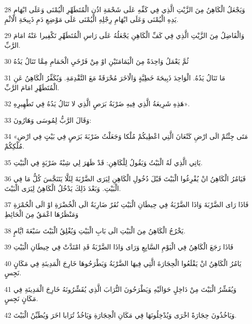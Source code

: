 \par 28 وَيَجْعَلُ الْكَاهِنُ مِنَ الزَّيْتِ الَّذِي فِي كَفِّهِ عَلَى شَحْمَةِ اذُنِ الْمُتَطَهِّرِ الْيُمْنَى وَعَلَى ابْهَامِ يَدِهِ الْيُمْنَى وَعَلَى ابْهَامِ رِجْلِهِ الْيُمْنَى عَلَى مَوْضِعِ دَمِ ذَبِيحَةِ الْاثْمِ.
\par 29 وَالْفَاضِلُ مِنَ الزَّيْتِ الَّذِي فِي كَفِّ الْكَاهِنِ يَجْعَلُهُ عَلَى رَاسِ الْمُتَطَهِّرِ تَكْفِيرا عَنْهُ امَامَ الرَّبِّ.
\par 30 ثُمَّ يَعْمَلُ وَاحِدَةً مِنَ الْيَمَامَتَيْنِ اوْ مِنْ فَرْخَيِ الْحَمَامِ مِمَّا تَنَالُ يَدُهُ
\par 31 مَا تَنَالُ يَدُهُ. الْوَاحِدَ ذَبِيحَةَ خَطِيَّةٍ وَالْاخَرَ مُحْرَقَةً مَعَ التَّقْدِمَةِ. وَيُكَفِّرُ الْكَاهِنُ عَنِ الْمُتَطَهِّرِ امَامَ الرَّبِّ.
\par 32 هَذِهِ شَرِيعَةُ الَّذِي فِيهِ ضَرْبَةُ بَرَصٍ الَّذِي لا تَنَالُ يَدُهُ فِي تَطْهِيرِهِ».
\par 33 وَقَالَ الرَّبُّ لِمُوسَى وَهَارُونَ:
\par 34 «مَتَى جِئْتُمْ الَى ارْضِ كَنْعَانَ الَّتِي اعْطِيكُمْ مُلْكا وَجَعَلْتُ ضَرْبَةَ بَرَصٍ فِي بَيْتٍ فِي ارْضِ مُلْكِكُمْ.
\par 35 يَاتِي الَّذِي لَهُ الْبَيْتُ وَيَقُولُ لِلْكَاهِنِ: قَدْ ظَهَرَ لِي شِبْهُ ضَرْبَةٍ فِي الْبَيْتِ.
\par 36 فَيَامُرُ الْكَاهِنُ انْ يُفْرِغُوا الْبَيْتَ قَبْلَ دُخُولِ الْكَاهِنِ لِيَرَى الضَّرْبَةَ لِئَلَّا يَتَنَجَّسَ كُلُّ مَا فِي الْبَيْتِ. وَبَعْدَ ذَلِكَ يَدْخُلُ الْكَاهِنُ لِيَرَى الْبَيْتَ.
\par 37 فَاذَا رَاى الضَّرْبَةَ وَاذَا الضَّرْبَةُ فِي حِيطَانِ الْبَيْتِ نُقَرٌ ضَارِبَةٌ الَى الْخُضْرَةِ اوْ الَى الْحُمْرَةِ وَمَنْظَرُهَا اعْمَقُ مِنَ الْحَائِطِ
\par 38 يَخْرُجُ الْكَاهِنُ مِنَ الْبَيْتِ الَى بَابِ الْبَيْتِ وَيُغْلِقُ الْبَيْتَ سَبْعَةَ ايَّامٍ.
\par 39 فَاذَا رَجَعَ الْكَاهِنُ فِي الْيَوْمِ السَّابِعِ وَرَاى وَاذَا الضَّرْبَةُ قَدِ امْتَدَّتْ فِي حِيطَانِ الْبَيْتِ
\par 40 يَامُرُ الْكَاهِنُ انْ يَقْلَعُوا الْحِجَارَةَ الَّتِي فِيهَا الضَّرْبَةُ وَيَطْرَحُوهَا خَارِجَ الْمَدِينَةِ فِي مَكَانٍ نَجِسٍ.
\par 41 وَيُقَشِّرُ الْبَيْتَ مِنْ دَاخِلٍ حَوَالَيْهِ وَيَطْرَحُونَ التُّرَابَ الَّذِي يُقَشِّرُونَهُ خَارِجَ الْمَدِينَةِ فِي مَكَانٍ نَجِسٍ.
\par 42 وَيَاخُذُونَ حِجَارَةً اخْرَى وَيُدْخِلُونَهَا فِي مَكَانِ الْحِجَارَةِ وَيَاخُذُ تُرَابا اخَرَ وَيُطَيِّنُ الْبَيْتَ.
